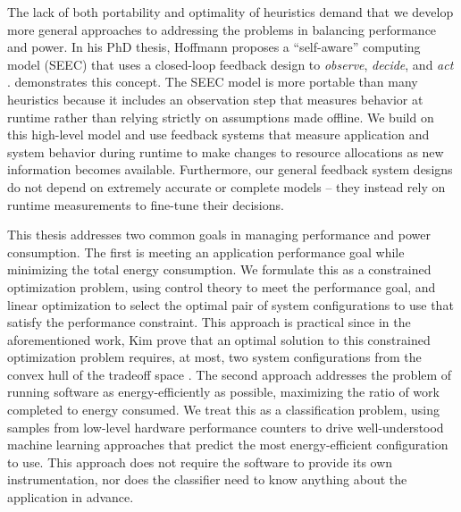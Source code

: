 The lack of both portability and optimality of heuristics demand that we develop more general approaches to addressing the problems in balancing performance and power.
In his PhD thesis, Hoffmann proposes a ``self-aware'' computing model (SEEC) that uses a closed-loop feedback design to \emph{observe}, \emph{decide}, and \emph{act} \cite{HoffmannPhD}.
 demonstrates this concept.
The SEEC model is more portable than many heuristics because it includes an observation step that measures behavior at runtime rather than relying strictly on assumptions made offline.
We build on this high-level model and use feedback systems that measure application and system behavior during runtime to make changes to resource allocations as new information becomes available.
Furthermore, our general feedback system designs do not depend on extremely accurate or complete models -- they instead rely on runtime measurements to fine-tune their decisions.

This thesis addresses two common goals in managing performance and power consumption.
The first is meeting an application performance goal while minimizing the total energy consumption.
We formulate this as a constrained optimization problem, using control theory to meet the performance goal, and linear optimization to select the optimal pair of system configurations to use that satisfy the performance constraint.
This approach is practical since in the aforementioned work, Kim \etal prove that an optimal solution to this constrained optimization problem requires, at most, two system configurations from the convex hull of the tradeoff space \cite{kim-cpsna2015}.
The second approach addresses the problem of running software as energy-efficiently as possible, \ie maximizing the ratio of work completed to energy consumed.
We treat this as a classification problem, using samples from low-level hardware performance counters to drive well-understood machine learning approaches that predict the most energy-efficient configuration to use.
This approach does not require the software to provide its own instrumentation, nor does the classifier need to know anything about the application in advance.
